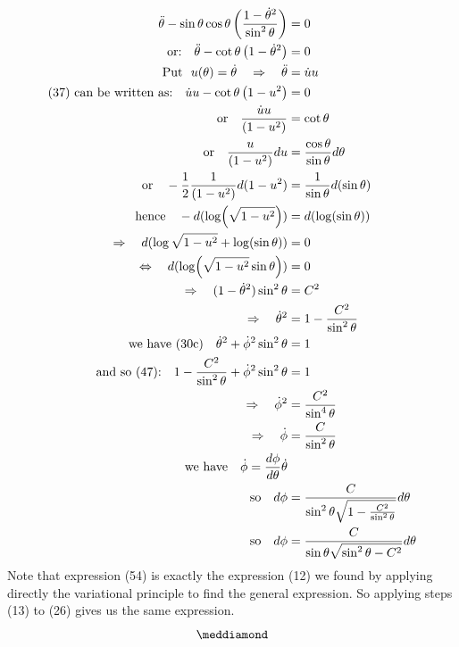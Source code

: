 \begin{align}
\ddot{\theta} - \sin\theta\cos\theta\left(\frac{1 - \dot{\theta}^2}{\sin^2\theta}\right)&= 0\\
\text{or:}\quad \ddot{\theta} - \cot\theta\left( 1-\dot{\theta}^2\right) &= 0\\
\text{Put }\ u(\theta)= \dot{\theta}\quad\Rightarrow\quad \ddot{\theta} &= \dot{u}u\\
\text{(37) can be written as:}\quad \dot{u}u - \cot\theta\left( 1-u^2\right) &= 0\\
\text{or}\quad \frac{\dot{u}u}{\left( 1-u^2\right)} &= \cot\theta\\
\text{or}\quad \frac{u}{\left( 1-u^2\right)}du &= \frac{\cos\theta}{\sin\theta} d\theta\\
\text{or}\quad -\frac{1}{2}\frac{1}{\left( 1-u^2\right)}d(1-u^2) &= \frac{1}{\sin \theta} d(\sin\theta)\\
\text{hence}\quad -d(\log (\sqrt{1-u^2})) &= d(\log(\sin\theta))\\
\Rightarrow \quad d(\log \sqrt{1-u^2} +\log(\sin\theta))&=0\\
\Leftrightarrow \quad d(\log( \sqrt{1-u^2}\sin\theta))&=0\\
\Rightarrow \quad (1-\dot{\theta}^2)\sin^2\theta &= C^2\\
\Rightarrow \quad \dot{\theta}^2&= 1-\frac{C^2}{\sin^2\theta}\\
\text{we have (30c)}\quad \dot{\theta}^2+\dot{\phi}^2\sin^2\theta &= 1\\
\text{and so (47):}\quad 1-\frac{C^2}{\sin^2\theta}+\dot{\phi}^2\sin^2\theta &= 1\\
\Rightarrow \quad \dot{\phi}^2 &= \frac{C^2}{\sin^4\theta}\\
\Rightarrow \quad \dot{\phi} &= \frac{C}{\sin^2\theta}\\
\text{we have} \quad \dot{\phi}=\dv{\phi}{\theta}\dot{\theta}\\
\text{so} \quad d\phi  &= \frac{C}{\sin^2\theta\sqrt{1-\frac{C^2}{\sin^2\theta}}}d\theta\\
\text{so} \quad d\phi  &= \frac{C}{\sin\theta\sqrt{\sin^2\theta-C^2}}d\theta
\end{align}
Note that expression (54) is exactly the expression (12) we found by applying directly the variational principle to find the general expression. So applying steps (13) to (26) gives us the same expression.
$$\meddiamond$$
\newpage
